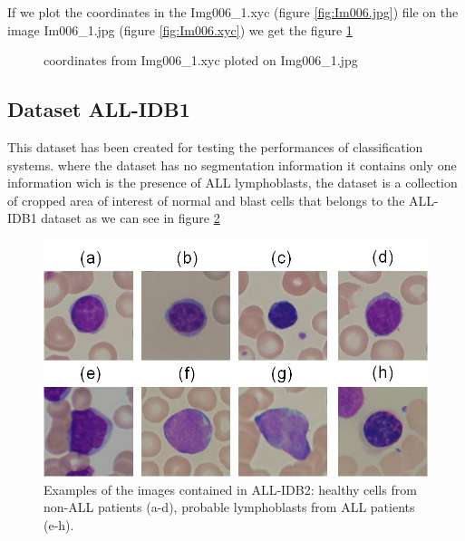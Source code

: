 If we plot the coordinates in the Img006\_1.xyc (figure \ref{fig:Im006.jpg}) file on the image Im006\_1.jpg (figure \ref{fig:Im006.xyc}) we get the figure \ref{fig:Im006.xyc.jpg}

\newpage

\begin{figure}[H]
\centering
\caption{coordinates from Img006\_1.xyc ploted on Img006\_1.jpg}
\label{fig:Im006.xyc.jpg}
\end{figure}

\subsection{Dataset ALL-IDB1}
\hspace{\parindent}
This dataset has been created for testing the performances of classification systems. where the dataset has no segmentation information it contains only one information wich is the presence of ALL lymphoblasts, the dataset is a collection of cropped area of interest of normal and blast cells that belongs to the ALL-IDB1 dataset as we can see in figure \ref{fig:ALL-IDB2}

\begin{figure}[H]
\centering
\includegraphics{../images/ALL-IDB2.jpg}
\caption{Examples of the images contained in ALL-IDB2: healthy cells from non-ALL patients (a-d), probable lymphoblasts from ALL patients (e-h).}
\label{fig:ALL-IDB2}
\end{figure}

